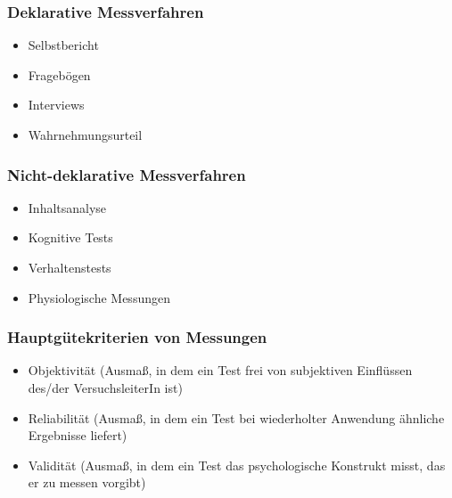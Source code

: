 \subsubsection{Deklarative Messverfahren}
\begin{itemize}
	\item Selbstbericht
	\item Fragebögen
	\item Interviews
	\item Wahrnehmungsurteil
\end{itemize}
\subsubsection{Nicht-deklarative Messverfahren}
\begin{itemize}
	\item Inhaltsanalyse
	\item Kognitive Tests
	\item Verhaltenstests
	\item Physiologische Messungen
\end{itemize}
\subsubsection{Hauptgütekriterien von Messungen}
\begin{itemize}
	\item Objektivität (Ausmaß, in dem ein Test frei von subjektiven Einflüssen des/der
VersuchsleiterIn ist)
	\item Reliabilität (Ausmaß, in dem ein Test bei wiederholter Anwendung ähnliche
Ergebnisse liefert)
	\item Validität (Ausmaß, in dem ein Test das psychologische \glqq{}Konstrukt\grqq{} misst, das
er zu messen vorgibt)
\end{itemize}





















